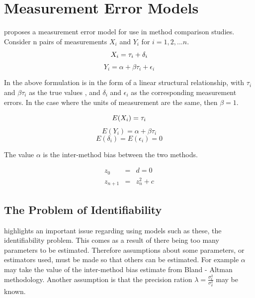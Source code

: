 \documentclass[12pt, a4paper]{report}
\theoremstyle{plain}
\theoremstyle{definition}
\theoremstyle{remark}
\begin{document}
\section{Measurement Error Models}

\citet{DunnSEME} proposes a measurement error model for use in
method comparison studies. Consider n pairs of measurements
$X_{i}$ and $Y_{i}$ for $i=1,2,...n$.
\begin{equation}
X_{i} = \tau_{i}+\delta_{i}\\
\end{equation}
\begin{equation}
Y_{i} = \alpha +\beta\tau_{i}+\epsilon_{i} \nonumber
\end{equation}

In the above formulation is in the form of a linear structural
relationship, with $\tau_{i}$ and $\beta\tau_{i}$ as the true
values , and $\delta_{i}$ and $\epsilon_{i}$ as the corresponding
measurement errors. In the case where the units of measurement are
the same, then $\beta =1$.

\begin{equation}
E(X_{i}) = \tau_{i}\\
\end{equation}
\begin{equation}
E(Y_{i}) = \alpha +\beta\tau_{i} \nonumber
\end{equation}
\begin{equation}
E(\delta_{i}) = E(\epsilon_{i}) = 0 \nonumber
\end{equation}

The value $\alpha$ is the inter-method bias between the two
methods.


\begin{eqnarray}
z_0 &=& d = 0 \\
z_{n+1} &=& z_n^2+c
\end{eqnarray}

\subsection{The Problem of Identifiability}
\citet{DunnSEME} highlights an important issue regarding using
models such as these, the identifiability problem. This comes as a
result of there being too many parameters to be estimated.
Therefore assumptions about some parameters, or estimators used,
must be made so that others can be estimated. For example $\alpha$
may take the value of the inter-method bias estimate from Bland -
Altman methodology. Another assumption is that the precision
ration $\lambda=\frac{\sigma^{2}_{\epsilon}}{\sigma^{2}_{\delta}}$
may be known.
\end{document}
